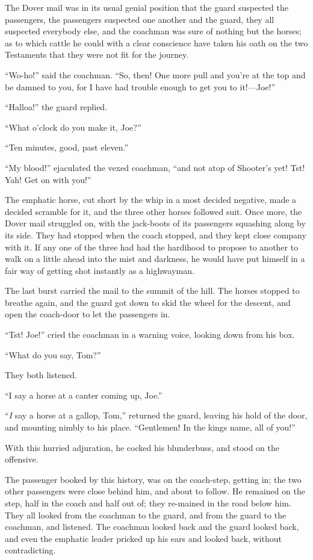 The Dover mail was in its usual genial position that the guard
suspected the passengers, the passengers suspected one another
and the guard, they all suspected everybody else, and the coachman
was sure of nothing but the horses; as to which cattle he could
with a clear conscience have taken his oath on the two Testaments
that they were not fit for the journey.

``Wo-ho!'' said the coachman.  ``So, then!  One more pull and you're
at the top and be damned to you, for I have had trouble enough to
get you to it!---Joe!''

``Halloa!'' the guard replied.

``What o'clock do you make it, Joe?''

``Ten minutes, good, past eleven.''

``My blood!'' ejaculated the vexed coachman, ``and not atop of
Shooter's yet!  Tst!  Yah!  Get on with you!''

The emphatic horse, cut short by the whip in a most decided
negative, made a decided scramble for it, and the three other
horses followed suit.  Once more, the Dover mail struggled on,
with the jack-boots of its passengers squashing along by its
side.  They had stopped when the coach stopped, and they kept
close company with it.  If any one of the three had had the
hardihood to propose to another to walk on a little ahead into
the mist and darkness, he would have put himself in a fair way
of getting shot instantly as a highwayman.

The last burst carried the mail to the summit of the hill.
The horses stopped to breathe again, and the guard got down to
skid the wheel for the descent, and open the coach-door to let
the passengers in.

``Tst!  Joe!'' cried the coachman in a warning voice, looking down
from his box.

``What do you say, Tom?''

They both listened.

``I say a horse at a canter coming up, Joe.''

``\emph{I} say a horse at a gallop, Tom,'' returned the guard, leaving
his hold of the door, and mounting nimbly to his place.
``Gentlemen!  In the kings name, all of you!''

With this hurried adjuration, he cocked his blunderbuss, and
stood on the offensive.

The passenger booked by this history, was on the coach-step,
getting in; the two other passengers were close behind him, and
about to follow.  He remained on the step, half in the coach and
half out of; they re-mained in the road below him.  They all
looked from the coachman to the guard, and from the guard to the
coachman, and listened.  The coachman looked back and the guard
looked back, and even the emphatic leader pricked up his ears and
looked back, without contradicting.

